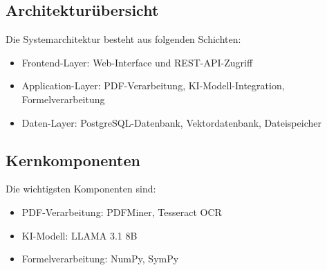 \subsection{Architekturübersicht}
Die Systemarchitektur besteht aus folgenden Schichten:
\begin{itemize}
    \item Frontend-Layer: Web-Interface und REST-API-Zugriff
    \item Application-Layer: PDF-Verarbeitung, KI-Modell-Integration, Formelverarbeitung
    \item Daten-Layer: PostgreSQL-Datenbank, Vektordatenbank, Dateispeicher
\end{itemize}

\subsection{Kernkomponenten}
Die wichtigsten Komponenten sind:
\begin{itemize}
    \item PDF-Verarbeitung: PDFMiner, Tesseract OCR
    \item KI-Modell: LLAMA 3.1 8B
    \item Formelverarbeitung: NumPy, SymPy
\end{itemize}
